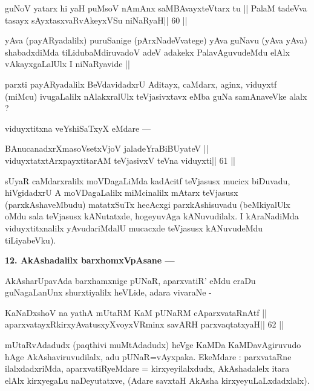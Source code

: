 \begin{shl}
guNoV yatarx hi yaH puMsoV nAmAnx saMBAvayxteV\s tarx tu ||
PalaM tadeVva tasayx sAyxtasxvaRvAkeyxVSu niNaRyaH\hfill || 60 ||
\end{shl}

\begin{artha}
yAva (payARyadalilx) puruSanige (pArxNadeVvatege) yAva guNavu (yAva yAva) shabadxdiMda tiLidubaMdiruvadoV adeV adakekx PalavAguvudeMdu elAlx vAkayxgaLalUlx I niNaRyavide ||
\end{artha}

\begin{artha}
parxti payARyadalilx BeVdavidadxrU Aditayx, caMdarx, aginx, viduyxtf (miMcu) ivugaLalilx nAlakxralUlx teVjasivxtavx eMba guNa samAnaveVke alalx ?
\end{artha}

\begin{artha}
viduyxtitxna veYshiSaTxyX eMdare --- 
\end{artha} 

\begin{shl}
BAnucanadxrXmasoVsetxVjoV jaladeYraBiBUyateV ||
viduyxtatxtArxpayxtitarAM teVjasivxV teVna viduyxti\hfill || 61 ||
\end{shl}

\begin{artha}
sUyaR caMdarxralilx moVDagaLiMda kadAcitf teVjasusx mucicx biDuvadu, hiVgidadxrU A moVDagaLalilx miMcinalilx mAtarx teVjasusx (parxkAshaveMbudu) matatxSuTx hecAcxgi parxkAshisuvadu (beMkiyalUlx oMdu sala teVjasusx kANutatxde, hogeyuvAga kANuvudilalx. I kAraNadiMda viduyxtitxnalilx yAvudariMdalU mucacxde teVjasusx kANuvudeMdu tiLiyabeVku).
\end{artha}

\begin{artha}
{\bf 12. AkAshadalilx barxhomxVpAsane ---}
\end{artha}

\begin{artha}
AkAsharUpavAda barxhamxnige pUNaR, aparxvatiR' eMdu eraDu guNagaLanUnx shurxtiyalilx heVLide, adara vivaraNe - 
\end{artha}

\begin{shl}
KaNaDxshoV na yathA mUtaRM KaM pUNaRM cAparxvataRnAtf ||
aparxvatayxRkirxyAvatusxyXvoyxVRminx savARH parxvaqtatxyaH\hfill || 62 ||
\end{shl}

\begin{artha}
mUtaRvAdadudx (paqthivi muMtAdadudx) heVge KaMDa KaMDavAgiruvudo hAge 
AkAshaviruvudilalx, adu pUNaR=vAyxpaka. EkeMdare : parxvataRne 
ilalxdadxriMda, aparxvatiRyeMdare = kirxyeyilalxdudx, AkAshadalelx 
itara elAlx kirxyegaLu naDeyutatxve, (Adare savxtaH AkAsha 
kirxyeyuLaLxdadxlalx).
\end{artha}

